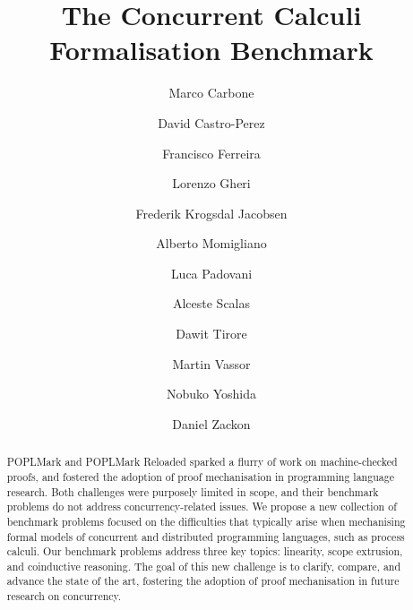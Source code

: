\documentclass[runningheads]{llncs}
\begin{document}
\title{The Concurrent Calculi Formalisation Benchmark}

\author{
     Marco Carbone 
\and David Castro-Perez 
\and Francisco Ferreira 
\and Lorenzo Gheri 
\and Frederik Krogsdal Jacobsen 
\and Alberto Momigliano 
\and Luca Padovani 
\and Alceste Scalas 
\and Dawit Tirore 
\and Martin Vassor 
\and Nobuko Yoshida 
\and Daniel Zackon 
}



\maketitle

\begin{abstract}
  POPLMark and POPLMark Reloaded sparked a flurry of work on machine-checked proofs, and fostered the adoption of proof mechanisation in programming language research.
  Both challenges were purposely limited in scope, and their benchmark problems do not address concurrency-related issues.
  We propose a new collection of benchmark problems focused on the difficulties that typically arise when mechanising formal models of concurrent and distributed programming languages, such as process calculi.
  Our benchmark problems address three key topics: linearity, scope extrusion, and coinductive reasoning.
  The goal of this new challenge is to clarify, compare, and advance the state of the art, fostering the adoption of proof mechanisation in future research on concurrency.

\end{abstract}
\end{document}
